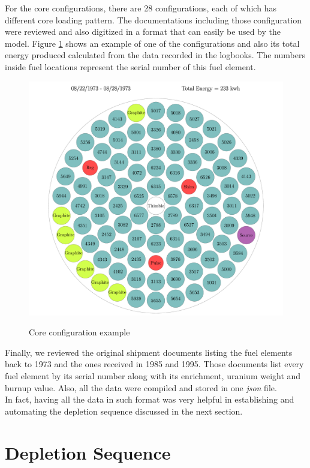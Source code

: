 \documentclass[review,number,sort&compress,12pt]{elsarticle}
\begin{document}
For the core configurations, there are 28 configurations, each of which has different core loading pattern. The documentations including those configuration were reviewed and also digitized in a format that can easily be used by the model.
Figure \ref{fig:coreii1_config} shows an example of one of the configurations and also its total energy produced calculated from the data recorded in the logbooks. The numbers inside fuel locations represent the serial number of this fuel element.

\begin{figure}[htp]
\centering
\includegraphics[scale=0.3]{coreii1.pdf}\\
\caption{Core configuration example}
\label{fig:coreii1_config}
\end{figure}

Finally, we reviewed the original shipment documents listing the fuel elements back to 1973 and the ones received in 1985 and 1995. Those documents list every fuel element by its serial number along with its enrichment, uranium weight and burnup value. Also, all the data were compiled and stored in one \emph{json} file.\\
In fact, having all the data in such format was very helpful in establishing and automating the depletion sequence discussed in the next section.


\section{Depletion Sequence}
\end{document}
